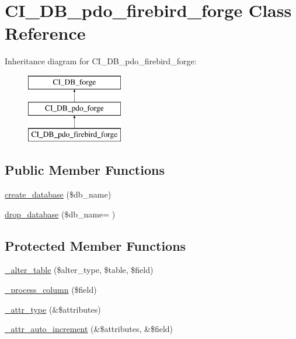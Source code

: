 \hypertarget{class_c_i___d_b__pdo__firebird__forge}{}\section{C\+I\+\_\+\+D\+B\+\_\+pdo\+\_\+firebird\+\_\+forge Class Reference}
\label{class_c_i___d_b__pdo__firebird__forge}
Inheritance diagram for C\+I\+\_\+\+D\+B\+\_\+pdo\+\_\+firebird\+\_\+forge\+:\begin{figure}[H]
\begin{center}
\leavevmode
\includegraphics[height=3.000000cm]{class_c_i___d_b__pdo__firebird__forge}
\end{center}
\end{figure}
\subsection*{Public Member Functions}
\begin{DoxyCompactItemize}
\item 
\hyperlink{class_c_i___d_b__pdo__firebird__forge_a902a7267babceb2ce595706f217e00ad}{create\+\_\+database} (\$db\+\_\+name)
\item 
\hyperlink{class_c_i___d_b__pdo__firebird__forge_a9e0a4706cac7e0bb62e76f23081000d4}{drop\+\_\+database} (\$db\+\_\+name= \textquotesingle{}\textquotesingle{})
\end{DoxyCompactItemize}
\subsection*{Protected Member Functions}
\begin{DoxyCompactItemize}
\item 
\hyperlink{class_c_i___d_b__pdo__firebird__forge_a41c6cae02f2fda8b429ad0afb9509426}{\+\_\+alter\+\_\+table} (\$alter\+\_\+type, \$table, \$field)
\item 
\hyperlink{class_c_i___d_b__pdo__firebird__forge_a8f38f1c5b5dddecca4befbe393f3f299}{\+\_\+process\+\_\+column} (\$field)
\item 
\hyperlink{class_c_i___d_b__pdo__firebird__forge_a8553be952084c6f7cdfff370a1d14f6b}{\+\_\+attr\+\_\+type} (\&\$attributes)
\item 
\hyperlink{class_c_i___d_b__pdo__firebird__forge_a2a013a5932439c3c44f0dad3436525f7}{\+\_\+attr\+\_\+auto\+\_\+increment} (\&\$attributes, \&\$field)
\end{DoxyCompactItemize}
